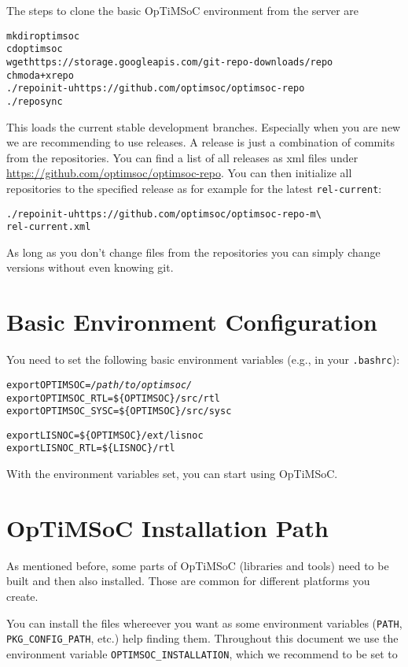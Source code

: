 The steps to clone the basic OpTiMSoC environment from the server are

\begin{alltt}
mkdir optimsoc
cd optimsoc
wget https://storage.googleapis.com/git-repo-downloads/repo
chmod a+x repo
./repo init -u https://github.com/optimsoc/optimsoc-repo
./repo sync
\end{alltt}

This loads the current stable development branches. Especially when
you are new we are recommending to use releases. A release is just a
combination of commits from the repositories. You can find a list of
all releases as xml files under
\url{https://github.com/optimsoc/optimsoc-repo}. You can then
initialize all repositories to the specified release as for example
for the latest \verb|rel-current|:

\begin{alltt}
./repo init -u https://github.com/optimsoc/optimsoc-repo -m \textbackslash
    rel-current.xml
\end{alltt}

As long as you don't change files from the repositories you can simply
change versions without even knowing git.

\section{Basic Environment Configuration}


You need to set the following basic environment variables (e.g., in your
\verb|.bashrc|):

\begin{alltt}
export OPTIMSOC=\emph{/path/to/optimsoc/}
export OPTIMSOC_RTL=\$\{OPTIMSOC\}/src/rtl
export OPTIMSOC_SYSC=\$\{OPTIMSOC\}/src/sysc

export LISNOC=\$\{OPTIMSOC\}/ext/lisnoc
export LISNOC_RTL=\$\{LISNOC\}/rtl
\end{alltt}

With the environment variables set, you can start using OpTiMSoC.

\section{OpTiMSoC Installation Path}

As mentioned before, some parts of OpTiMSoC (libraries and tools) need
to be built and then also installed. Those are common for different
platforms you create.

You can install the files whereever you want as some environment
variables (\verb|PATH|, \verb|PKG_CONFIG_PATH|, etc.) help finding
them. Throughout this document we use the environment variable
\verb|OPTIMSOC_INSTALLATION|, which we recommend to be set to

